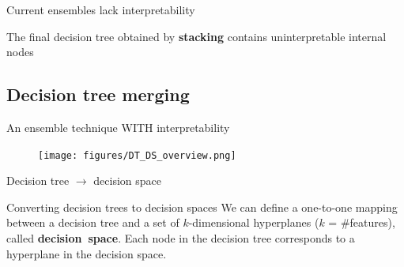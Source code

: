 \documentclass[english]{beamer}
\begin{document}
\begin{frame}{Current ensembles lack interpretability}
	\begin{block}{}
		The final decision tree obtained by \textbf{stacking} contains uninterpretable internal nodes
	\end{block}
	
	\vspace{2em}
	
	
\end{frame}

\subsection*{Decision tree merging}

{
\begin{frame}{An ensemble technique WITH interpretability}
	\begin{figure}
		\centering
		\texttt{[image: figures/DT\_DS\_overview.png]}
	\end{figure}
\end{frame} }

\begin{frame}{Decision tree $\rightarrow$ decision space}
	\begin{block}{Converting decision trees to decision spaces}
		We can define a one-to-one mapping between a decision tree and a set of $k$-dimensional hyperplanes ($k$ = $\#$features), called \textbf{decision~space}.	Each node in the decision tree corresponds to a hyperplane in the decision space.
	\end{block}
\end{frame}
\end{document}
